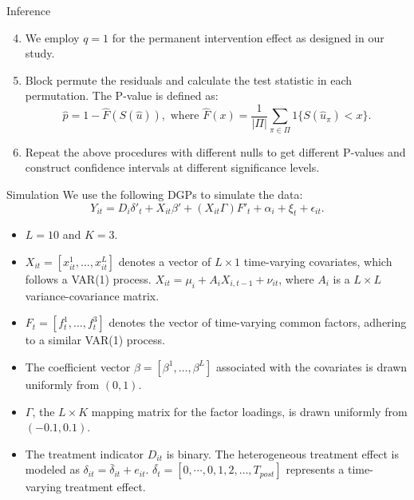 \documentclass{beamer}
\begin{document}
\begin{frame}{Inference}
\begin{enumerate}
\setcounter{enumi}{3}
    \item We employ $q=1$ for the permanent intervention effect as designed in our study.
    \item Block permute the residuals and calculate the test statistic in each permutation. The P-value is defined as:
    \begin{equation*}
    \hat{p} = 1 - \hat{F}(S(\hat{u})), \text{ where } \hat{F}(x) = \frac{1}{|\Pi|} \sum_{\pi \in \Pi} 1\{S(\hat{u}_\pi) < x\}.
    \end{equation*}
    \item Repeat the above procedures with different nulls to get different P-values and construct confidence intervals at different significance levels.
\end{enumerate}
\end{frame}

\begin{frame}{Simulation}
We use the following DGPs to simulate the data:
$$
Y_{it} = D_{i} \delta'_{t} + X_{it}\beta' + (X_{it}\Gamma) F'_{t} + \alpha_i + \xi_t + \epsilon_{it}.
$$

\begin{itemize}
    \item $L=10$ and $K=3$.
    \item $X_{it} = [x_{it}^1, \ldots, x_{it}^{L}]$ denotes a vector of $L \times 1$ time-varying covariates, which follows a VAR(1) process. $X_{it} = \mu_i + A_i X_{i,t-1} + \nu_{it}$, where $A_i$ is a $ L \times L$ variance-covariance matrix.
    \item $F_t = [f_t^1, \ldots, f_t^3]$ denotes the vector of time-varying common factors, adhering to a similar VAR(1) process.
    \item The coefficient vector $\beta = [\beta^1, \ldots, \beta^{L}]$ associated with the covariates is drawn uniformly from $(0,1)$. 
    \item $\Gamma$, the $L \times K$ mapping matrix for the factor loadings, is drawn uniformly from $(-0.1, 0.1)$.
    \item The treatment indicator $D_{it}$ is binary. The heterogeneous treatment effect is modeled as $\delta_{it} = \bar{\delta}_{it} + e_{it}$. $\bar{\delta_t} = [0, \cdots, 0, 1,2,\ldots,T_{post}]$ represents a time-varying treatment effect.
\end{itemize}
\end{frame}
\end{document}
